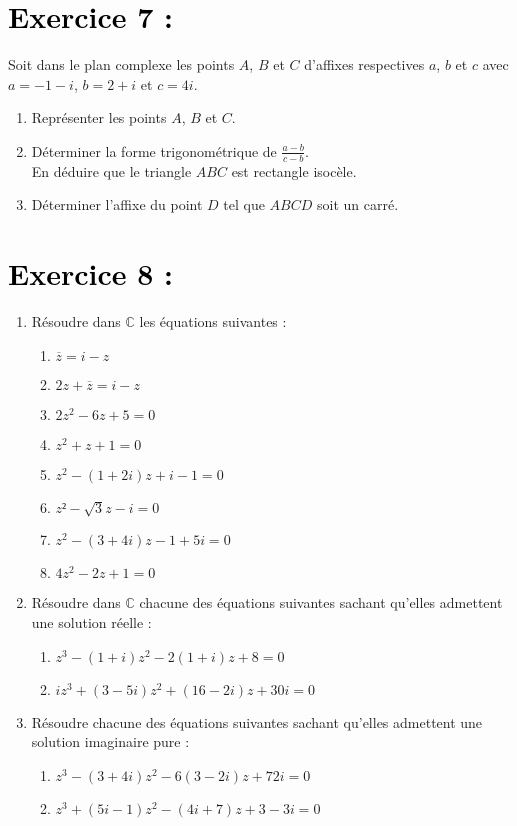 \documentclass[12pt]{article}
\begin{document}
\section*{\textcolor{black}{Exercice 7 :}}

Soit dans le plan complexe les points $A$, $B$ et $C$ d’affixes respectives $a$, $b$ et $c$ avec $a = -1 - i$, $b = 2 + i$ et $c = 4i$.

\begin{enumerate}
    \item Représenter les points $A$, $B$ et $C$.
    \item Déterminer la forme trigonométrique de $\frac{a - b}{c - b}$.\\  
    En déduire que le triangle $ABC$ est rectangle isocèle.
    \item Déterminer l’affixe du point $D$ tel que $ABCD$ soit un carré.
\end{enumerate}

\section*{\textcolor{black}{Exercice 8 :}}

\begin{enumerate}
    \item Résoudre dans $\mathbb{C}$ les équations suivantes :
    \begin{enumerate}
        \item $\overline{z} = i - z$
        \item $2z + \overline{z} = i - z$
        \item $2z^2 - 6z + 5 = 0$
        \item $z^2 + z + 1 = 0$
        \item $z^2 - (1 + 2i)z + i - 1 = 0$
        \item $z² - \sqrt{3}z - i = 0$
        \item $z^2 - (3 + 4i)z - 1 + 5i = 0$
        \item $4z^2 - 2z + 1 = 0$
    \end{enumerate}

    \item Résoudre dans $\mathbb{C}$ chacune des équations suivantes sachant qu’elles admettent une solution réelle :
    \begin{enumerate}
        \item $z^3 - (1 + i)z^2 - 2(1 + i)z + 8 = 0$
        \item $iz^3 + (3 - 5i)z^2 + (16 - 2i)z + 30i = 0$
    \end{enumerate}

    \item Résoudre chacune des équations suivantes sachant qu’elles admettent une solution imaginaire pure :
    \begin{enumerate}
        \item $z^3 - (3 + 4i)z^2 - 6(3 - 2i)z + 72i = 0$
        \item $z^3 + (5i - 1)z^2 - (4i + 7)z + 3 - 3i = 0$
    \end{enumerate}
\end{enumerate}
\end{document}
